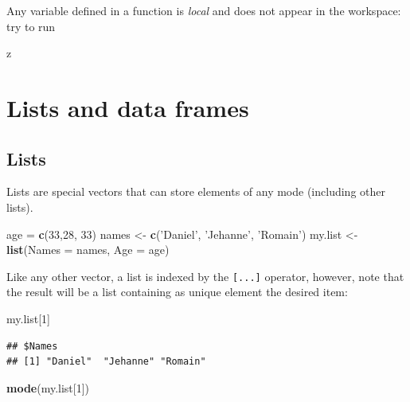 \documentclass[]{book}
\newenvironment{Shaded}{\begin{snugshade}}{\end{snugshade}}
\newcommand{\DataTypeTok}[1]{\textcolor[rgb]{0.13,0.29,0.53}{#1}}
\newcommand{\DecValTok}[1]{\textcolor[rgb]{0.00,0.00,0.81}{#1}}
\newcommand{\KeywordTok}[1]{\textcolor[rgb]{0.13,0.29,0.53}{\textbf{#1}}}
\newcommand{\NormalTok}[1]{#1}
\newcommand{\StringTok}[1]{\textcolor[rgb]{0.31,0.60,0.02}{#1}}
\begin{document}
Any variable defined in a function is \emph{local} and does not appear in the workspace: try to run

\begin{Shaded}
\begin{Highlighting}[]
\NormalTok{z}
\end{Highlighting}
\end{Shaded}

\hypertarget{lists-and-data-frames}{%
\chapter{Lists and data frames}\label{lists-and-data-frames}}

\hypertarget{lists}{%
\section{Lists}\label{lists}}

Lists are special vectors that can store elements of any mode (including other lists).

\begin{Shaded}
\begin{Highlighting}[]
\NormalTok{age =}\StringTok{ }\KeywordTok{c}\NormalTok{(}\DecValTok{33}\NormalTok{,}\DecValTok{28}\NormalTok{, }\DecValTok{33}\NormalTok{)}
\NormalTok{names <-}\StringTok{ }\KeywordTok{c}\NormalTok{(}\StringTok{'Daniel'}\NormalTok{, }\StringTok{'Jehanne'}\NormalTok{, }\StringTok{'Romain'}\NormalTok{)}
\NormalTok{my.list <-}\StringTok{ }\KeywordTok{list}\NormalTok{(}\DataTypeTok{Names =}\NormalTok{ names, }\DataTypeTok{Age =}\NormalTok{ age)}
\end{Highlighting}
\end{Shaded}

Like any other vector, a list is indexed by the \texttt{{[}...{]}} operator, however, note that the result will be a list containing as unique element the desired item:

\begin{Shaded}
\begin{Highlighting}[]
\NormalTok{my.list[}\DecValTok{1}\NormalTok{]}
\end{Highlighting}
\end{Shaded}

\begin{verbatim}
## $Names
## [1] "Daniel"  "Jehanne" "Romain"
\end{verbatim}

\begin{Shaded}
\begin{Highlighting}[]
\KeywordTok{mode}\NormalTok{(my.list[}\DecValTok{1}\NormalTok{])}
\end{Highlighting}
\end{Shaded}
\end{document}

